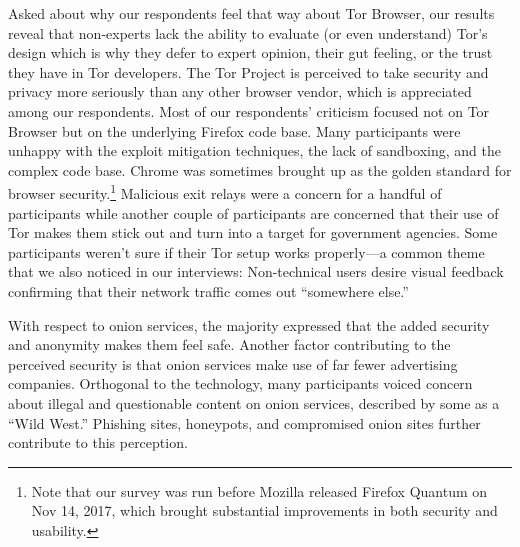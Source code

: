 Asked about why our respondents feel that way about Tor Browser, our results
reveal that non-experts lack the ability to evaluate (or even understand) Tor's
design which is why they defer to expert opinion, their gut feeling, or the
trust they have in Tor developers.  The Tor Project is perceived to take
security and privacy more seriously than any other browser vendor, which is
appreciated among our respondents.  Most of our respondents' criticism focused
not on Tor Browser but on the underlying Firefox code base.  Many participants
were unhappy with the exploit mitigation techniques, the lack of sandboxing, and
the complex code base.  Chrome was sometimes brought up as the golden standard
for browser security.\footnote{Note that our survey was run before Mozilla
released Firefox Quantum on Nov 14, 2017, which brought substantial improvements
in both security and usability.}  Malicious exit relays were a concern for a
handful of participants while another couple of participants are concerned that
their use of Tor makes them stick out and turn into a target for government
agencies.  Some participants weren't sure if their Tor setup works properly---a
common theme that we also noticed in our interviews: Non-technical users desire
visual feedback confirming that their network traffic comes out ``somewhere
else.''

With respect to onion services, the majority expressed that the added security
and anonymity makes them feel safe.  Another factor contributing to the
perceived security is that onion services make use of far fewer advertising
companies.  Orthogonal to the technology, many participants voiced concern about
illegal and questionable content on onion services, described by some as a
``Wild West.''  Phishing sites, honeypots, and compromised onion sites further
contribute to this perception.
